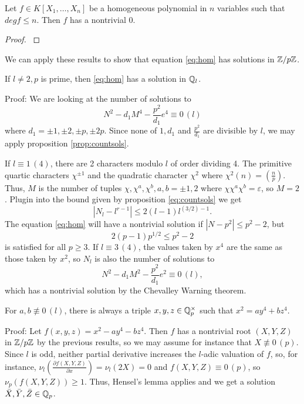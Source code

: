 \documentclass[12pt, a4paper]{amsart}
\begin{document}
\begin{prop}
  Let $f \in K[X_1, \dots , X_n]$ be a homogeneous polynomial
  in $n$ variables such that $deg f \leq n$. Then $f$ has a nontrivial 0.
\end{prop}

\begin{proof}
  \cite[See][Chapter 1, page 5]{Serre}
\end{proof}

We can apply these results to show that equation \ref{eq:hom} has solutions
in ${\mathbb Z}/p{\mathbb Z}$.

\begin{lemma}
  If $l \neq 2, p$ is prime, then \ref{eq:hom} has a solution in ${\mathbb Q}_l$.
\end{lemma}
Proof: We are looking at the number of solutions to
\[ N^2 - d_1M^4 - \frac{p^2}{d_1}e^4 \equiv 0 \, (l)\]
where $d_1 = \pm 1, \pm 2, \pm p, \pm 2p$. Since none of $1, d_1$ and
$\frac{p^2}{d_1}$ are divisible by $l$, we may apply
proposition \ref{prop:countsols}.

If $l \equiv 1 \, (4)$, there are 2 characters modulo
 $l$ of order dividing 4. The primitive quartic
characters $\chi^{\pm 1}$ and the quadratic character $\chi^2$ where $\chi^2(n) =
(\frac{n}{p})$. Thus, $M$ is the number of tuples $\chi, \chi^a, \chi^b,
a,b = \pm 1, 2$ where $\chi \chi^a \chi^b = \varepsilon$, so $M = 2$. Plugin
into the bound given by proposition \ref{eq:countsols} we get
\[|N_l - l^{r-1} | \leq 2(l-1) l^{(3/2)-1}.\]
The equation \ref{eq:hom} will have a nontrivial solution if $|N-p^2| \leq
p^2-2$, but
\[2(p-1)p^{1/2} \leq p^2 - 2\]
is satisfied for all $p \geq 3$.
If $l \equiv 3 \, (4)$, the values taken by $x^4$ are the same as those taken
by $x^2$, so $N_l$ is also the number of solutions to
\[N^2 - d_1M^2 - \frac{p^2}{d_1} e^2 \equiv 0 \, (l),\]
which has a nontrivial solution by the Chevalley Warning theorem. \qedhere

\begin{thm}
  For $a, b \not\equiv 0 \, (l)$, there is always a triple
  $x, y, z \in {\mathbb Q}_p^{\times}$ such that $x^2 = ay^4 + bz^4$.
\end{thm}
Proof: Let $f(x,y,z) = x^2 - ay^4 - bz^4$. Then $f$ has a nontrivial root
$(X,Y,Z)$ in ${\mathbb Z}/p{\mathbb Z}$ by the previous results, so we may assume for instance
that $X \not\equiv 0 \, (p)$.
Since $l$ is odd, neither partial derivative increases the $l$-adic valuation
of $f$, so, for instance, $\nu_l(\frac{\partial f(X,Y,Z)}{\partial x}) =
\nu_l(2X) = 0$ and $f(X,Y,Z) \equiv 0 \, (p)$, so $\nu_p(f(X,Y,Z)) \geq 1$.
Thus, Hensel's lemma applies and we get a solution $\bar{X}, \bar{Y}, \bar{Z}
\in {\mathbb Q}_p$. \qedhere
\end{document}
